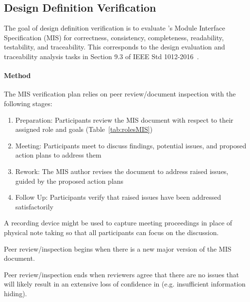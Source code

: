 \subsection{Design Definition Verification}\label{sec:designVV}
The goal of design definition verification is to evaluate \progname{}'s
Module Interface Specification (MIS) for correctness, consistency,
completeness, readability, testability, and traceability. This corresponds to
the design evaluation and traceability analysis tasks in Section 9.3 of IEEE
Std 1012-2016~\citep{vvIEEE}.

\paragraph{Method} The MIS verification plan relies on peer review/document
inspection with the following stages:
\begin{enumerate}

    \item Preparation: Participants review the MIS document with respect to
    their assigned role and goals (Table~\ref{tab:rolesMIS})

    \item Meeting: Participants meet to discuss findings, potential issues,
    and proposed action plans to address them

    \item Rework: The MIS author revises the document to address raised issues,
    guided by the proposed action plans

    \item Follow Up: Participants verify that raised issues have been addressed
    satisfactorily

\end{enumerate}

A recording device might be used to capture meeting proceedings in place of
physical note taking so that all participants can focus on the discussion.

Peer review/inspection begins when there is a new major version of the MIS
document.

Peer review/inspection ends when reviewers agree that there are no issues that
will likely result in an extensive loss of confidence in \progname{} (e.g.
insufficient information hiding).

